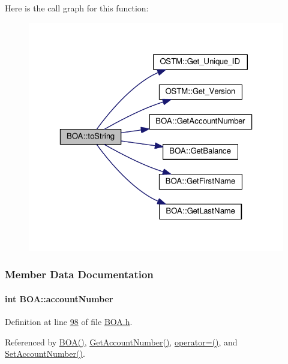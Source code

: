 Here is the call graph for this function\+:
\nopagebreak
\begin{figure}[H]
\begin{center}
\leavevmode
\includegraphics[width=323pt]{class_b_o_a_a348df0299997f81bcad0ec034dab0b8d_a348df0299997f81bcad0ec034dab0b8d_cgraph}
\end{center}
\end{figure}




\subsubsection{Member Data Documentation}
\paragraph[{\texorpdfstring{account\+Number}{accountNumber}}]{\setlength{\rightskip}{0pt plus 5cm}int B\+O\+A\+::account\+Number\hspace{0.3cm}{\ttfamily [private]}}\hypertarget{class_b_o_a_a86ca4ad716db205f04c337b39b34d9ba_a86ca4ad716db205f04c337b39b34d9ba}{}\label{class_b_o_a_a86ca4ad716db205f04c337b39b34d9ba_a86ca4ad716db205f04c337b39b34d9ba}


Definition at line \hyperlink{_b_o_a_8h_source_l00098}{98} of file \hyperlink{_b_o_a_8h_source}{B\+O\+A.\+h}.



Referenced by \hyperlink{_b_o_a_8h_source_l00024}{B\+O\+A()}, \hyperlink{_b_o_a_8cpp_source_l00074}{Get\+Account\+Number()}, \hyperlink{_b_o_a_8h_source_l00064}{operator=()}, and \hyperlink{_b_o_a_8cpp_source_l00070}{Set\+Account\+Number()}.

